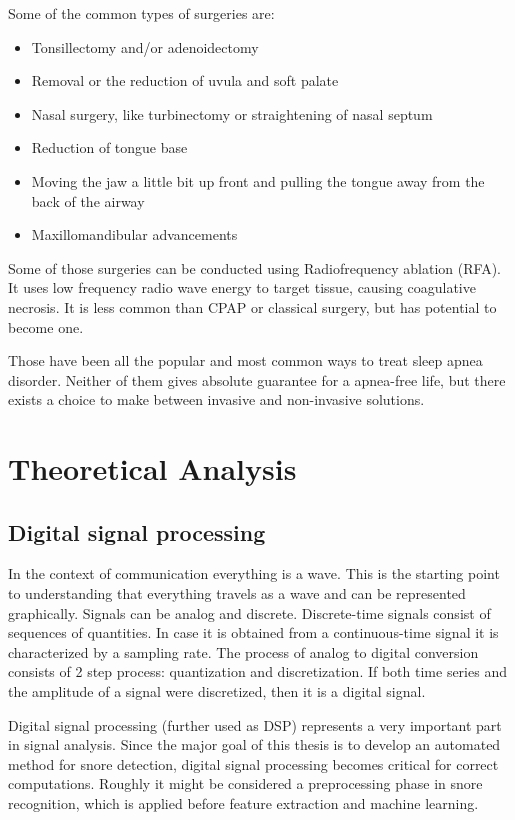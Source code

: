 \documentclass[12pt,a4paper]{report}
\begin{document}
Some of the common types of surgeries are:
\begin{itemize}
 \item Tonsillectomy and/or adenoidectomy 
 \item Removal or the reduction of uvula and soft palate
 \item Nasal surgery, like turbinectomy or straightening of nasal septum
 \item Reduction of tongue base
 \item Moving the jaw a little bit up front and pulling the tongue away from the back of the airway
 \item Maxillomandibular advancements
\end{itemize}

Some of those surgeries can be conducted using Radiofrequency ablation (RFA). It uses low frequency radio wave energy to target tissue, causing coagulative necrosis. It is less common than CPAP or classical surgery, but has potential to become one.


Those have been all the popular and most common ways to treat sleep apnea disorder. Neither of them gives absolute guarantee for a apnea-free life, but there exists a choice to make between invasive and non-invasive solutions. 

\section{Theoretical Analysis}
\subsection{Digital signal processing}
In the context of communication everything is a wave. This is the starting point to understanding that everything travels as a wave and can be represented graphically. Signals can be analog and discrete. Discrete-time signals consist of sequences of quantities. In case it is obtained from a continuous-time signal it is characterized by a sampling rate. The process of analog to digital conversion consists of 2 step process: quantization and discretization. If both time series and the amplitude of a signal were discretized, then it is a digital signal.

Digital signal processing (further used as DSP) represents a very important part in signal analysis. Since the major goal of this thesis is to develop an automated method for snore detection, digital signal processing becomes critical for correct computations. Roughly it might be considered a preprocessing phase in snore recognition, which is applied before feature extraction and machine learning. 
\end{document}
